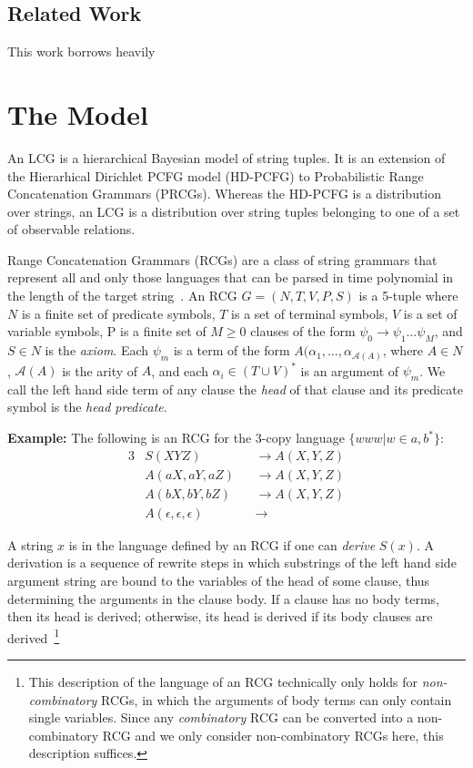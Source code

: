 \documentclass{article}
\begin{document}
\subsection{Related Work}
This work borrows heavily 

\section{The Model}
An LCG is a hierarchical Bayesian model of string tuples. It is an
extension of the Hierarhical Dirichlet PCFG model (HD-PCFG) to
Probabilistic Range Concatenation Grammars (PRCGs). Whereas the
HD-PCFG is a distribution over strings, an LCG is a distribution over
string tuples belonging to one of a set of observable
relations. 

Range Concatenation Grammars (RCGs) are a class of string grammars
that represent all and only those languages that can be parsed in time
polynomial in the length of the target
string~\cite{boullier2005range}. An RCG $G=(N, T, V, P, S)$ is a
5-tuple where $N$ is a finite set of predicate symbols, $T$ is a set
of terminal symbols, $V$ is a set of variable symbols, P is a finite
set of $M \geq 0$ clauses of the form $\psi_0 \rightarrow \psi_1 \dots
\psi_M$, and $S \in N$ is the \emph{axiom}. Each $\psi_m$ is a term of
the form $A(\alpha_1, \dots, \alpha_{\mathcal{A}(A)}$, where $A \in
N$, $\mathcal{A}(A)$ is the arity of $A$, and each $\alpha_i \in (T
\cup V)^*$ is an argument of $\psi_m$. We call the left hand side term
of any clause the \emph{head} of that clause and its predicate symbol
is the \emph{head predicate}.

\textbf{Example:} The following is an RCG for the 3-copy language
$\{www | w \in {a, b}^*\}$:
\begin{alignat*}{3}
&S(XYZ) &&\rightarrow A(X, Y, Z)\\
&A(aX, aY, aZ) &&\rightarrow A(X, Y, Z)\\
&A(bX, bY, bZ) &&\rightarrow A(X, Y, Z)\\
&A(\epsilon, \epsilon, \epsilon) &&\rightarrow 
\end{alignat*}

A string $x$ is in the language defined by an RCG if one can
\emph{derive} $S(x)$. A derivation is a sequence of rewrite steps in
which substrings of the left hand side argument string are bound to
the variables of the head of some clause, thus determining the
arguments in the clause body. If a clause has no body terms, then its
head is derived; otherwise, its head is derived if its body clauses
are derived~\footnote{This description of the language of an RCG
  technically only holds for \emph{non-combinatory} RCGs, in which the
  arguments of body terms can only contain single variables. Since any
  \emph{combinatory} RCG can be converted into a non-combinatory RCG
  and we only consider non-combinatory RCGs here, this description
  suffices.}
\end{document}
